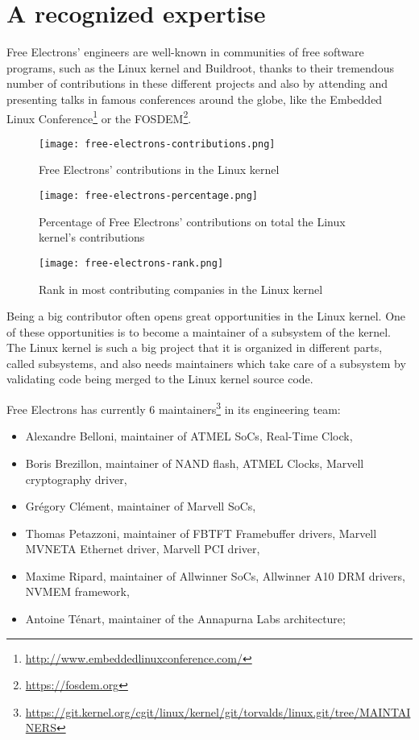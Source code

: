 \section{A recognized expertise}
Free Electrons' engineers are well-known in communities of free software programs, such as the Linux kernel and Buildroot, thanks to their tremendous number of contributions in these different projects and also by attending and presenting talks in famous conferences around the globe, like the Embedded Linux Conference\footnote{\url{http://www.embeddedlinuxconference.com/}} or the FOSDEM\footnote{\url{https://fosdem.org}}.

\begin{figure}[H]
  \texttt{[image: free-electrons-contributions.png]}
  \caption{Free Electrons' contributions in the Linux kernel}
\end{figure}
\begin{figure}[H]
  \texttt{[image: free-electrons-percentage.png]}
  \caption{Percentage of Free Electrons' contributions on total the Linux kernel's contributions}
\end{figure}
\begin{figure}[H]
  \texttt{[image: free-electrons-rank.png]}
  \caption{Rank in most contributing companies in the Linux kernel}
\end{figure}

Being a big contributor often opens great opportunities in the Linux kernel. One of these opportunities is to become a maintainer of a subsystem of the kernel. The Linux kernel is such a big project that it is organized in different parts, called subsystems, and also needs maintainers which take care of a subsystem by validating code being merged to the Linux kernel source code.

Free Electrons has currently 6 maintainers\footnote{\url{https://git.kernel.org/cgit/linux/kernel/git/torvalds/linux.git/tree/MAINTAINERS}} in its engineering team:
\begin{itemize}
\item Alexandre Belloni, maintainer of ATMEL SoCs, Real-Time Clock,
\item Boris Brezillon, maintainer of NAND flash, ATMEL Clocks, Marvell cryptography driver,
\item Grégory Clément, maintainer of Marvell SoCs,
\item Thomas Petazzoni, maintainer of FBTFT Framebuffer drivers, Marvell MVNETA Ethernet driver, Marvell PCI driver,
\item Maxime Ripard, maintainer of Allwinner SoCs, Allwinner A10 DRM drivers, NVMEM framework,
\item Antoine Ténart, maintainer of the Annapurna Labs architecture;
\end{itemize}

